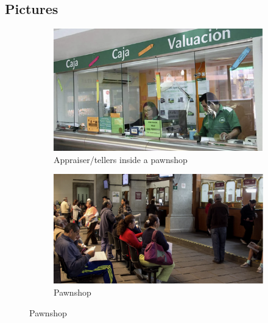 \newpage



\section{ }
\vspace{.2in}




\vspace{.1in}

\subsection{Pictures}

\begin{figure}[H]
     \caption{Some Pawnshops}
    \label{PawnshopPicture}
    \begin{center}
    \begin{subfigure}{0.42\textwidth}
    \caption{Appraiser/tellers inside a pawnshop}
        \centering
        \includegraphics[width=\textwidth]{Figuras/empenio9.png}
    \end{subfigure}
        \begin{subfigure}{0.45\textwidth}
    \caption{Pawnshop}
        \centering
        \includegraphics[width=\textwidth]{Figuras/empenio11.png}
    \end{subfigure}
    

\end{center}
\end{figure}

